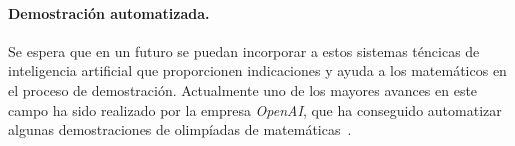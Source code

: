 \paragraph{Demostración automatizada.} Se espera que en un
futuro se puedan incorporar a estos sistemas téncicas de inteligencia artificial
que proporcionen indicaciones y ayuda a los matemáticos en el proceso de
demostración. Actualmente uno de los mayores avances en este campo ha sido
realizado por la empresa \textit{OpenAI}, que ha conseguido automatizar algunas
demostraciones de olimpíadas de matemáticas~\cite{poluSolvingFormalMath}.

